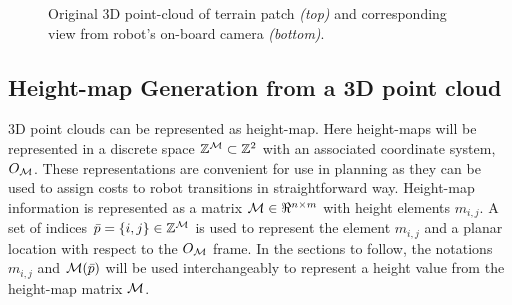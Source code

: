 				\begin{figure}[!h]
					\centering
					\caption{Original 3D point-cloud of terrain patch \emph{(top)} and corresponding view from robot's on-board camera \emph{(bottom)}.}
					\label{fig::pointcloud_terrain_patch}
				\end{figure}


		\subsection{Height-map Generation from a 3D point cloud}
			
			3D point clouds can be represented as height-map. Here height-maps will be represented in a discrete space ${\Bbb Z}^{{\cal M}}\subset{\Bbb Z}^{2}$ with an associated coordinate system, $O_{{\cal M}}$. These representations are convenient for use in planning as they can be used to assign costs to robot transitions in straightforward way. Height-map information is represented as a matrix ${\cal M}\in \Re^{n\times m}$ with height elements $m_{i,j}$. A set of indices $\bar{p} = \{i,j\}\in{\Bbb Z}^{{\cal M}}$ is used to represent the element $m_{i,j}$ and a planar location with respect to the $O_{{\cal M}}$ frame. In the sections to follow, the notations $m_{i,j}$ and ${\cal M}(\bar{p})$ will be used interchangeably to represent a height value from the height-map matrix ${\cal M}$.


